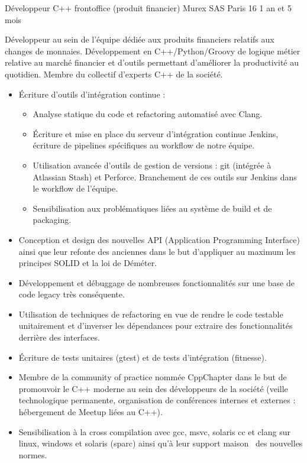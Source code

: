 \documentclass[11pt,a4paper,sans]{moderncv} %
\begin{document}
{Développeur C++ frontoffice (produit financier)}
{Murex SAS}
{Paris 16}
{1 an et 5 mois}
{Développeur au sein de l'équipe dédiée aux produits financiers relatifs aux changes de monnaies. Développement en C++/Python/Groovy de logique métier relative au marché financier et d'outils permettant d'améliorer la productivité au quotidien. Membre du collectif d'experts C++ de la société.
\begin{itemize}
\item Écriture d'outils d'intégration continue :
	\begin{itemize}
	\item Analyse statique du code et refactoring automatisé avec Clang.
	\item Écriture et mise en place du serveur d'intégration continue Jenkins, écriture de pipelines spécifiques au workflow de notre équipe.
    \item Utilisation avancée d'outils de gestion de versions : git (intégrée à Atlassian Stash) et Perforce. Branchement de ces outils sur Jenkins dans le workflow de l'équipe.
	\item Sensibilisation aux problématiques liées au système de build et de packaging.
	\end{itemize}
\item Conception et design des nouvelles API (Application Programming Interface) ainsi que leur refonte des anciennes dans le but d'appliquer au maximum les principes SOLID et la loi de Déméter.
\item Développement et débuggage de nombreuses fonctionnalités sur une base de code legacy très conséquente.
\item Utilisation de techniques de refactoring en vue de rendre le code testable unitairement et d'inverser les dépendances pour extraire des fonctionnalités derrière des interfaces.
\item Écriture de tests unitaires (gtest) et de tests d'intégration (fitnesse).
\item Membre de la \og community of practice \fg nommée CppChapter dans le but de promouvoir le C++ moderne au sein des développeurs de la société (veille technologique permanente, organisation de conférences internes et externes : hébergement de Meetup liées au C++).
\item Sensibilisation à la cross compilation avec gcc, msvc, solaris cc et clang sur linux, windows et solaris (sparc) ainsi qu'à leur support \og maison \fg ~des nouvelles normes.
\end{itemize}}
\end{document}
